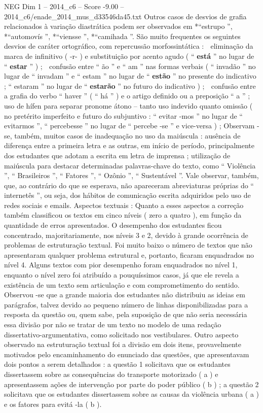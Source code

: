 \begin{textsample}{NEG Dim 1 – 2014\_c6 – Score -9.00 – 2014\_c6/enade\_2014\_mus\_d33546da45.txt}
Outros casos de desvios de grafia relacionados à variação diastrática podem ser observados em *“estrupo ”, *“automovís ”, *“viensse ”, *“camihada ”.
São muito frequentes os seguintes desvios de caráter ortográfico, com repercussão morfossintática :  eliminação da marca de infinitivo ( -r- ) e substituição por acento agudo ( “ \textbf{está} ” no lugar de “ \textbf{estar} ” ) ;  confusão entre “ ão ” e “ am ” nas formas verbais ( “ invadão ” no lugar de “ invadam ” e “ estam ” no lugar de “ \textbf{estão} ” no presente do indicativo ; “ estaram ” no lugar de “ \textbf{estarão} ” no futuro do indicativo ) ;  confusão entre a grafia do verbo “ haver ” ( “ há ” ) e o artigo definido ou a preposição “ a ” ;  uso de hífen para separar pronome átono – tanto uso indevido quanto omissão ( no pretérito imperfeito e futuro do subjuntivo : “ evitar -mos ” no lugar de “ evitarmos ”, “ percebesse ” no lugar de “ percebe -se ” e vice-versa ) ; Observam -se, também, muitos casos de inadequação no uso da maiúscula : ausência de diferença entre a primeira letra e as outras, em início de período, principalmente dos estudantes que adotam a escrita em letra de imprensa ; utilização de maiúscula para destacar determinadas palavras-chave do texto, como “ Violência ”, “ Brasileiros ”, “ Fatores ”, “ Ozônio ”, “ Sustentável ”.
Vale observar, também, que, ao contrário do que se esperava, não apareceram abreviaturas próprias do “ internetês ”, ou seja, dos hábitos de comunicação escrita adquiridos pelo uso de redes sociais e emails.
Aspectos textuais : Quanto a esses aspectos a correção também classificou os textos em cinco níveis ( zero a quatro ), em função da quantidade de erros apresentados.
O desempenho dos estudantes ficou concentrado, majoritariamente, nos níveis 3 e 2, devido à grande ocorrência de problemas de estruturação textual.
Foi muito baixo o número de textos que não apresentaram qualquer problema estrutural e, portanto, ficaram enquadrados no nível 4.
Alguns textos com pior desempenho foram enquadrados no nível 1, enquanto o nível zero foi atribuído a pouquíssimos casos, já que ele revela a existência de um texto sem articulação e com comprometimento do sentido.
Observou -se que a grande maioria dos estudantes não distribuiu as ideias em parágrafos, talvez devido ao pequeno número de linhas disponibilizadas para a resposta da questão ou, quem sabe, pela suposição de que não seria necessária essa divisão por não se tratar de um texto no modelo de uma redação dissertativo-argumentativa, como solicitado nos vestibulares.
Outro aspecto observado na estruturação textual foi a divisão em dois itens, provavelmente motivados pelo encaminhamento do enunciado das questões, que apresentavam dois pontos a serem detalhados : a questão 1 solicitava que os estudantes dissertassem sobre as consequências do transporte motorizado ( a ) e apresentassem ações de intervenção por parte do poder público ( b ) ; a questão 2 solicitava que os estudantes dissertassem sobre as causas da violência urbana ( a ) e os fatores para evitá -la ( b ).

\end{textsample}
